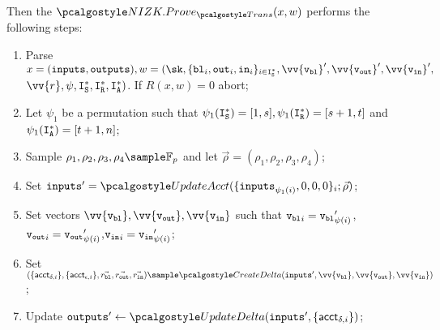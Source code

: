 Then the $\nizkprove_{\trans}(x,w)$ performs the following steps:
\begin{enumerate}
    \item Parse $x=(\inputs, \outputs), w = (\sk, \{{\varbl}_i, {\varout}_i, {\varin}_i\}_{i \in \isset^*}, \vv{\vbl}^\prime, \vv{\vout}^\prime, \vv{\vin}^\prime, $ \\ $ \vv{r}, \psi, \isset^*, \irset^*, \ianset^*)$. If $R(x,w) = 0$ abort;
    \vspace{0.1cm}

    \item Let $\psi_1$ be a permutation such that $\psi_1(\mathtt{I}_{\mathtt{S}}^*) = [1,s], \psi_1(\mathtt{I}_{\mathtt{R}}^*) = [s+1,t]$ and $\psi_1(\mathtt{I}_{\mathtt{A}}^*) = [t+1, n]$;

    \item Sample $\rho_1, \rho_2, \rho_3, \rho_4 \sample \mathbb{F}_p$ and let $\vec{\rho} = (\rho_1, \rho_2, \rho_3, \rho_4)$;
    \vspace{0.1cm}

    \item Set $\inputs^\prime = \updacc(\{\inputs_{\psi_{1}(i)},0,0,0\}_i; \vec{\rho})$;
    \vspace{0.1cm}

    \item Set vectors $\vv{\vbl}, \vv{\vout}, \vv{\vin}$ such that ${\textup{\texttt{{v}}}_{\textup{\texttt{{bl}}}}}_i = {\textup{\texttt{{v}}}_{\textup{\texttt{{bl}}}}}^\prime_{\psi(i)}$, ${\textup{\texttt{{v}}}_{\textup{\texttt{{out}}}}}_i = {\textup{\texttt{{v}}}_{\textup{\texttt{{out}}}}}^\prime_{\psi(i)}$,${\textup{\texttt{{v}}}_{\textup{\texttt{{in}}}}}_i = {\textup{\texttt{{v}}}_{\textup{\texttt{{in}}}}}^\prime_{\psi(i)}$;
    \vspace{0.1cm}

    \item Set $(\{\acct_{\delta,i}\}, \{\acct_{\epsilon,i}\}, \vec{r_\varbl}, \vec{r_\varout}, \vec{r_\varin}) \sample \createdelta(\inputs', \vv{\vbl}, \vv{\vout}, \vv{\vin})$;
    \vspace{0.1cm}
    
    \item Update $\outputs' \gets \upddelta(\inputs', \{\acct_{\delta,i}\})$;
    \vspace{0.1cm}



\end{enumerate}
